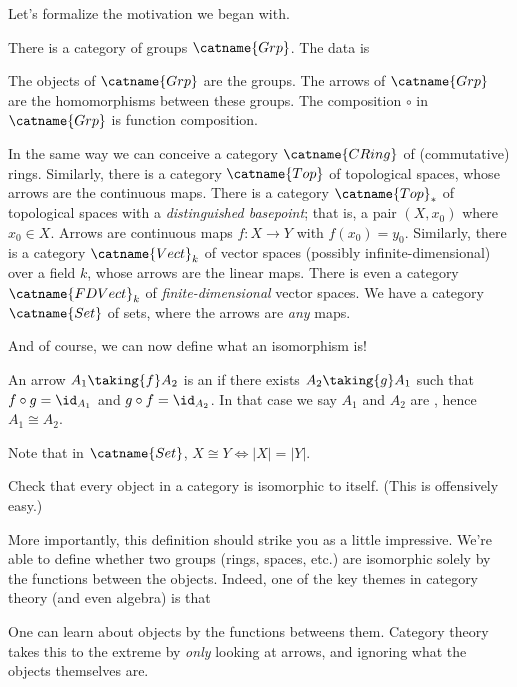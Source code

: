 Let's formalize the motivation we began with.
\begin{example}
	\listhack
	\label{example:basic_categories}
	\begin{enumerate}[(a)]
		\ii There is a category of groups $\catname{Grp}$. The data is
		\begin{itemize}
			\ii The objects of $\catname{Grp}$ are the groups.
			\ii The arrows of $\catname{Grp}$ are the homomorphisms between these groups.
			\ii The composition $\circ$ in $\catname{Grp}$ is function composition.
		\end{itemize}
		\ii In the same way we can conceive a category $\catname{CRing}$ of (commutative) rings.
		\ii Similarly, there is a category $\catname{Top}$ of topological spaces,
		whose arrows are the continuous maps.
		\ii There is a category $\catname{Top}_\ast$ of topological spaces with a \emph{distinguished basepoint};
		that is, a pair $(X, x_0)$ where $x_0 \in X$.
		Arrows are continuous maps $f : X \to Y$ with $f(x_0) = y_0$.
		\ii Similarly, there is a category $\catname{Vect}_k$ of
		vector spaces (possibly infinite-dimensional) over a field $k$,
		whose arrows are the linear maps.
		There is even a category $\catname{FDVect}_k$ of
		\emph{finite-dimensional} vector spaces.
		\ii We have a category $\catname{Set}$ of sets,
		where the arrows are \emph{any} maps.
	\end{enumerate}
\end{example}
And of course, we can now define what an isomorphism is!
\begin{definition}
	An arrow $A_1 \taking{f} A_2$ is an 
	if there exists $A_2 \taking{g} A_1$ such that $f \circ g = \id_{A_1}$
	and $g \circ f = \id_{A_2}$.
	In that case we say $A_1$ and $A_2$ are , hence $A_1 \cong A_2$.
\end{definition}
\begin{remark}
	Note that in $\catname{Set}$, $X \cong Y
	\iff \left\lvert X \right\rvert = \left\lvert Y \right\rvert$.
\end{remark}
\begin{ques}
	Check that every object in a category is isomorphic to itself.
	(This is offensively easy.)
\end{ques}
More importantly, this definition should strike you as a little impressive.
We're able to define whether two groups (rings, spaces, etc.) are isomorphic
solely by the functions between the objects.
Indeed, one of the key themes in category theory (and even algebra) is that
\begin{moral}
	One can learn about objects by the functions betweens them.
	Category theory takes this to the extreme by \emph{only} looking at arrows,
	and ignoring what the objects themselves are.
\end{moral}

